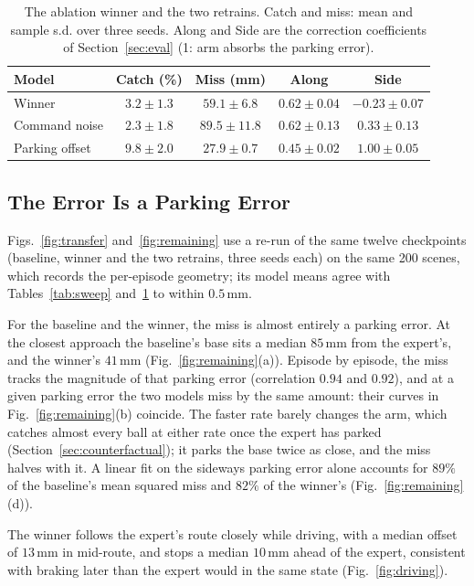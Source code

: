 \documentclass[conference]{IEEEtran}
\begin{document}
\begin{table}[t]
\centering
\caption{The ablation winner and the two retrains. Catch and miss: mean and sample s.d. over three seeds. Along and Side are the correction coefficients of Section~\ref{sec:eval} (1: arm absorbs the parking error).}
\label{tab:three}
\footnotesize
\setlength{\tabcolsep}{4pt}
\begin{tabular}{lcccc}
\toprule
Model & Catch (\%) & Miss (mm) & Along & Side \\
\midrule
Winner & $3.2\pm 1.3$ & $59.1\pm 6.8$ & $0.62\pm 0.04$ & $-0.23\pm 0.07$ \\
Command noise & $2.3\pm 1.8$ & $89.5\pm 11.8$ & $0.62\pm 0.13$ & $0.33\pm 0.13$ \\
Parking offset & $\mathbf{9.8\pm 2.0}$ & $\mathbf{27.9\pm 0.7}$ & $0.45\pm 0.02$ & $\mathbf{1.00\pm 0.05}$ \\
\bottomrule
\end{tabular}
\end{table}

\subsection{The Error Is a Parking Error}
\label{sec:parking}
Figs.~\ref{fig:transfer} and~\ref{fig:remaining} use a re-run of the same twelve checkpoints (baseline, winner and the two retrains, three seeds each) on the same 200 scenes, which records the per-episode geometry; its model means agree with Tables~\ref{tab:sweep} and~\ref{tab:three} to within $0.5\,\mathrm{mm}$.

For the baseline and the winner, the miss is almost entirely a parking error. At the closest approach the baseline's base sits a median $85\,\mathrm{mm}$ from the expert's, and the winner's $41\,\mathrm{mm}$ (Fig.~\ref{fig:remaining}(a)). Episode by episode, the miss tracks the magnitude of that parking error (correlation $0.94$ and $0.92$), and at a given parking error the two models miss by the same amount: their curves in Fig.~\ref{fig:remaining}(b) coincide. The faster rate barely changes the arm, which catches almost every ball at either rate once the expert has parked (Section~\ref{sec:counterfactual}); it parks the base twice as close, and the miss halves with it. A linear fit on the sideways parking error alone accounts for $89\%$ of the baseline's mean squared miss and $82\%$ of the winner's (Fig.~\ref{fig:remaining}(d)).

The winner follows the expert's route closely while driving, with a median offset of $13\,\mathrm{mm}$ in mid-route, and stops a median $10\,\mathrm{mm}$ ahead of the expert, consistent with braking later than the expert would in the same state (Fig.~\ref{fig:driving}).
\end{document}
